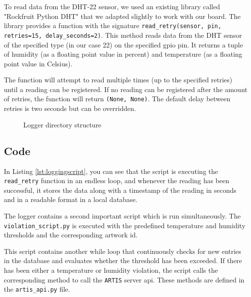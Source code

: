 To read data from the DHT-22 sensor, we used an existing library called "Rockfruit Python DHT" \cite{rockfruitpythondht} that we adapted slightly to work with our board. The library provides a function with the signature \texttt{read\_retry(sensor, pin, retries=15, delay\_seconds=2)}. This method reads data from the DHT sensor of the specified type (in our case 22) on the specified \gls{gpio} pin. It returns a tuple of humidity (as a floating point value in percent) and temperature (as a floating point value in Celsius). 

The function will attempt to read multiple times (up to the specified retries) until a reading can be registered. If no reading can be registered after the amount of retries, the function will return \texttt{(None, None)}. The default delay between retries is two seconds but can be overridden.

\begin{figure}[ht]
    \centering
        
    \caption{Logger directory structure}
    \label{fig:artis-logger-filetree}
\end{figure}

\subsection{Code}


In Listing \ref{lst:loggingscript}, you can see that the script is executing the \texttt{read\_retry} function in an endless loop, and whenever the reading has been successful, it stores the data along with a timestamp of the reading in seconds and in a readable format in a local database.

The logger contains a second important script which is run simultaneously. The \texttt{violation\_script.py} is executed with the predefined temperature and humidity thresholds and the corresponding artwork \gls{id}.



This script contains another while loop that continuously checks for new entries in the database and evaluates whether the threshold has been exceeded. If there has been either a temperature or humidity violation, the script calls the corresponding method to call the \texttt{ARTIS} server \gls{api}. These methods are defined in the \texttt{artis\_api.py} file.

